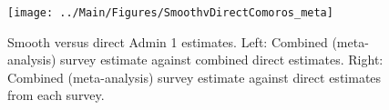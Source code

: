 \documentclass[12pt]{article}\usepackage[]{graphicx}\usepackage[]{color}
\newenvironment{knitrout}{}{} %
\begin{document}



\begin{knitrout}
\color{fgcolor}\begin{figure}[bht]

{\centering \texttt{[image: ../Main/Figures/SmoothvDirectComoros\_meta]} 

}

\caption[Smooth versus direct Admin 1 estimates]{Smooth versus direct Admin 1 estimates. Left: Combined (meta-analysis) survey estimate against combined direct estimates. Right: Combined (meta-analysis) survey estimate against direct estimates from each survey.}\label{fig:unnamed-chunk-63}
\end{figure}


\end{knitrout}
\end{document}
